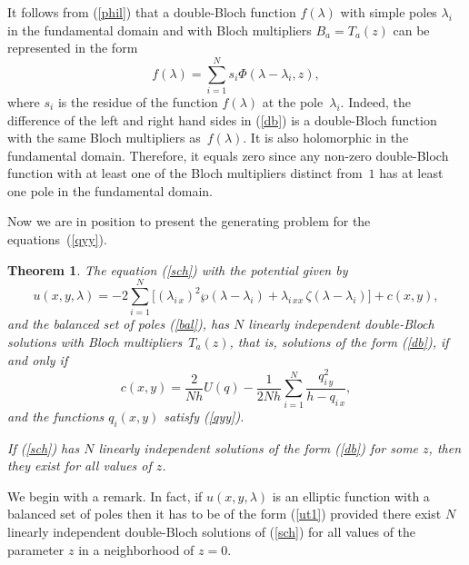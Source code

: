 \documentclass[a4paper,11pt]{article}
\theoremstyle{plain}
\newtheorem{teo}{Theorem}
\theoremstyle{remark}
\begin{document}
It follows from (\ref{phil}) that a double-Bloch function $f(\lambda)$
with simple poles $\lambda_i$ in the fundamental domain and with Bloch
multipliers $B_a=T_a(z)$  can be represented in the form
\begin{equation}\label{db}
f(\lambda)=\sum_{i=1}^N s_i \Phi(\lambda-\lambda_i,z),
\end{equation}
where $s_i$ is the residue of the function $f(\lambda)$ at the
pole~$\lambda_i$. Indeed, the difference of the left and right hand sides
in (\ref{db}) is a double-Bloch function with the same Bloch multipliers
as~$f(\lambda)$. It is also holomorphic in the fundamental domain.
Therefore, it equals zero since any non-zero double-Bloch
function with at least one of the Bloch multipliers distinct from~$1$
has at least one pole in the fundamental domain.

Now we are in position to present the generating problem for the
equations~(\ref{qyy}).
\begin{teo}
The equation \emph{(\ref{sch})} with the potential given by
\begin{equation}\label{ut1}
u(x,y,\lambda)=-2\sum_{i=1}^N \bigl[ (\lambda_{i\,x})^2\wp(\lambda-\lambda_i)
+\lambda_{i\,xx}\,\zeta(\lambda-\lambda_i) \bigr] +c(x,y),
\end{equation}
and the balanced set of poles \emph{(\ref{bal})}, has $N$ linearly independent
double-Bloch solutions with Bloch multipliers~$T_a(z)$,
that is, solutions of the form \emph{(\ref{db})}, if and only if
\begin{equation}\label{c}
c(x,y)=\frac{2}{Nh} U(q)-
\frac{1}{2Nh} \sum_{i=1}^N \frac{q_{i\,y}^2}{h-q_{i\,x}} ,
\end{equation}
and the functions $q_i(x,y)$ satisfy \emph{(\ref{qyy})}.

If \emph{(\ref{sch})} has $N$ linearly independent solutions of the form
\emph{(\ref{db})} for some $z$, then they exist for all values of $z$.
\end{teo}

 We begin with a remark. In fact, if
$u(x,y,\lambda)$ is an elliptic function with a balanced set of
poles then it has to be of the form (\ref{ut1}) provided there
exist $N$ linearly independent double-Bloch solutions of
(\ref{sch}) for all values of the parameter $z$ in a neighborhood
of $z=0$.
\end{document}

